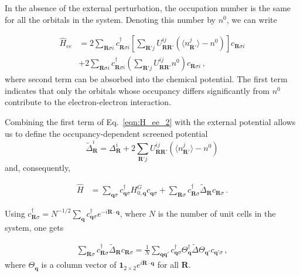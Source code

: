 \documentclass[aps, prb, superscriptaddress, preprint, floatfix]{revtex4-1}
\begin{document}
In the absence of the external perturbation, the occupation number is the same for all the orbitals in the system. Denoting this number by $n^0$, we can write

%
\begin{align}
    \hat{H}_{ee} &= 
   2\sum_{\mathbf{R}\sigma i}
    c^\dagger_{\mathbf{R}\sigma i} 
    \left[\sum_{\mathbf{R}'j}
    U_{\mathbf{RR}'}^{ij}
   \left( \langle n_{\mathbf{R}'}^j\rangle - n^0\right)
    \right]
    c_{\mathbf{R}\sigma i} 
    \nonumber
    \\
    &+
    2\sum_{\mathbf{R}\sigma i}
    c^\dagger_{\mathbf{R}\sigma i} 
    \left(\sum_{\mathbf{R}'j}
    U_{\mathbf{RR}'}^{ij}
    n^0
    \right)
    c_{\mathbf{R}\sigma i} \,,
    \label{eqn:H_ee_2}
\end{align}
%
where second term can be absorbed into the chemical potential. The first term indicates that only the orbitals whose occupancy differs significantly from $n^0$ contribute to the electron-electron interaction.

Combining the first term of Eq.~\eqref{eqn:H_ee_2} with the external potential allows us to define the occupancy-dependent screened potential
%
\begin{equation}
    \tilde{\Delta}_\mathbf{R}^i = \Delta_\mathbf{R}^i + 2\sum_{\mathbf{R}'j}
    U_{\mathbf{RR}'}^{ij}
   \left( \langle n_{\mathbf{R}'}^j\rangle - n^0\right)
\end{equation}
%
and, consequently,

%
\begin{align}
    \hat{H} &= \sum_{\mathbf{q}\sigma} c^\dagger_{\mathbf{q}\sigma}
    H_{0,\mathbf{q}}^G 
    c_{\mathbf{q}\sigma}
    +\sum_{\mathbf{R}\sigma} c_{\mathbf{R}\sigma}^\dagger \tilde{\Delta}_{\mathbf{R}} c_{\mathbf{R}\sigma}
    \,.
    \label{eqn:H}
\end{align}
%

Using  $c^\dagger_{\mathbf{R}\sigma} = N^{-1/2}\sum_\mathbf{q}c^\dagger_{\mathbf{q}\sigma} e^{-i\mathbf{R}\cdot\mathbf{q}}$, where $N$ is the number of unit cells in the system, one gets

%
\begin{align}
	\sum_{\mathbf{R}\sigma} c_{\mathbf{R}\sigma}^\dagger  \tilde{\Delta}_{\mathbf{R}} c_{\mathbf{R}\sigma}
	=\frac{1}{N}\sum_{\mathbf{qq}'} c_{\mathbf{q}\sigma}^\dagger \Theta_{\mathbf{q}}^\dagger\tilde{\Delta} \Theta_{\mathbf{q}'}c_{\mathbf{q}'\sigma}\,,
	\label{eqn:Delta}
\end{align}
%
where $\Theta_\mathbf{q}$ is a column vector of $\mathbf{1}_{2\times 2} e^{i\mathbf{R}\cdot\mathbf{q}}$ for all $\mathbf{R}$.
\end{document}
